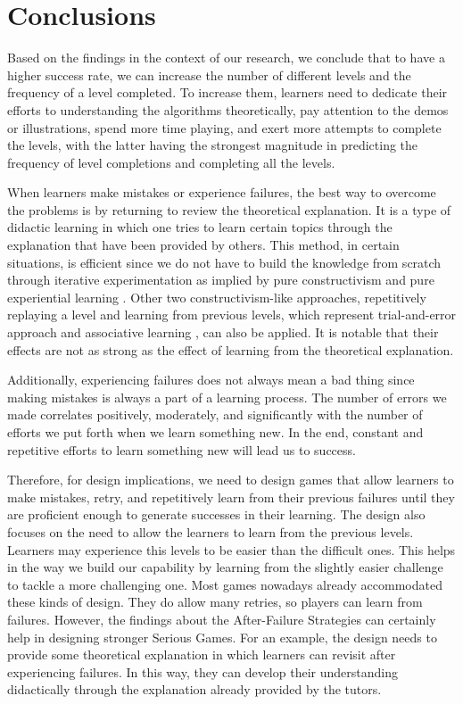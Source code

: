 \documentclass[conference]{IEEEtran}
\begin{document}
\section{Conclusions}
\label{sec:conclusions}

Based on the findings in the context of our research, we conclude that to have a higher success rate, we can increase the number of different levels and the frequency of a level completed. To increase them, learners need to dedicate their efforts to understanding the algorithms theoretically, pay attention to the demos or illustrations, spend more time playing, and exert more attempts to complete the levels, with the latter having the strongest magnitude in predicting the frequency of level completions and completing all the levels. 

When learners make mistakes or experience failures, the best way to overcome the problems is by returning to review the theoretical explanation. It is a type of didactic learning \cite{Austin2013} in which one tries to learn certain topics through the explanation that have been provided by others. This method, in certain situations, is efficient since we do not have to build the knowledge from scratch through iterative experimentation as implied by pure constructivism \cite{McComas2014} and pure experiential learning \cite{kolb2014experiential}. Other two constructivism-like approaches,  repetitively replaying a level and learning from previous levels, which represent trial-and-error approach \cite{Fitzgerald2009} and associative learning \cite{Jozefowiez2012}, can also be applied. It is notable that their effects are not as strong as the effect of learning from the theoretical explanation.

Additionally, experiencing failures does not always mean a bad thing since making mistakes is always a part of a learning process. The number of errors we made correlates positively, moderately, and significantly with the number of efforts we put forth when we learn something new. In the end, constant and repetitive efforts to learn something new will lead us to success.

Therefore, for design implications, we need to design games that allow learners to make mistakes, retry, and repetitively learn from their previous failures until they are proficient enough to generate successes in their learning. The design also focuses on the need to allow the learners to learn from the previous levels. Learners may experience this levels to be easier than the difficult ones. This helps in the way we build our capability by learning from the slightly easier challenge to tackle a more challenging one. Most games nowadays already accommodated these kinds of design. They do allow many retries, so players can learn from failures. However, the findings about the After-Failure Strategies can certainly help in designing stronger Serious Games. For an example, the design needs to provide some theoretical explanation in which learners can revisit after experiencing failures. In this way, they can develop their understanding didactically through the explanation already provided by the tutors. 
\end{document}
